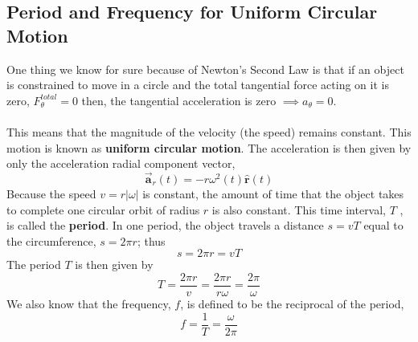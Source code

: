 \documentclass[12pt,addpoints]{exam}
\begin{document}
	\subsection*{Period and Frequency for Uniform Circular Motion}
	One thing we know for sure because of Newton's Second Law is that if an object is constrained to move in a circle and the total tangential force acting on it is zero,  $F^{total}_\theta=0$ then, the tangential acceleration is zero $\implies a_{\theta}=0$. \\ \\
	This means that the magnitude of the velocity (the speed) remains constant. This motion is known as \textbf{uniform circular motion}. The acceleration is then given by only the acceleration radial component vector,
	$$\overrightarrow{\mathbf{a}}_{r}(t)=-r \omega^{2}(t) \hat{\mathbf{r}}(t)$$
	Because the speed $v=r|\omega|$ is constant, the amount of time that the object takes to complete one circular orbit of radius $r$ is also constant. This time interval, $T$ , is called the \textbf{period}. In one period, the object travels a distance $s = vT$ equal to the circumference, $s=2\pi r$; thus
	$$s=2 \pi r=v T$$
	The period $T$ is then given by
	$$T=\frac{2 \pi r}{v}=\frac{2 \pi r}{r \omega}=\frac{2 \pi}{\omega}$$
	We also know that the frequency, $f$, is defined to be the reciprocal of the period,
	$$f=\frac{1}{T}=\frac{\omega}{2 \pi} $$
	
	
	
\end{document}
